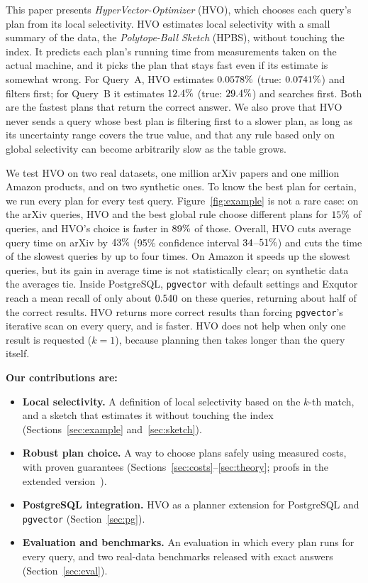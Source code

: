 \documentclass[sigconf, nonacm]{acmart}
\begin{document}
This paper presents \emph{HyperVector-Optimizer} (HVO), which chooses each query's plan from its local selectivity. HVO estimates local selectivity with a small summary of the data, the \emph{Polytope-Ball Sketch} (HPBS), without touching the index. It predicts each plan's running time from measurements taken on the actual machine, and it picks the plan that stays fast even if its estimate is somewhat wrong. For Query~A, HVO estimates $0.0578\%$ (true: $0.0741\%$) and filters first; for Query~B it estimates $12.4\%$ (true: $29.4\%$) and searches first. Both are the fastest plans that return the correct answer. We also prove that HVO never sends a query whose best plan is filtering first to a slower plan, as long as its uncertainty range covers the true value, and that any rule based only on global selectivity can become arbitrarily slow as the table grows.

We test HVO on two real datasets, one million arXiv papers and one million Amazon products, and on two synthetic ones. To know the best plan for certain, we run every plan for every test query. Figure~\ref{fig:example} is not a rare case: on the arXiv queries, HVO and the best global rule choose different plans for $15\%$ of queries, and HVO's choice is faster in $89\%$ of those. Overall, HVO cuts average query time on arXiv by $43\%$ (95\% confidence interval $34$--$51\%$) and cuts the time of the slowest queries by up to four times. On Amazon it speeds up the slowest queries, but its gain in average time is not statistically clear; on synthetic data the averages tie. Inside PostgreSQL, \texttt{pgvector} with default settings and Exqutor reach a mean recall of only about $0.540$ on these queries, returning about half of the correct results. HVO returns more correct results than forcing \texttt{pgvector}'s iterative scan on every query, and is faster. HVO does not help when only one result is requested ($k=1$), because planning then takes longer than the query itself.

\noindent\textbf{Our contributions are:}
\begin{itemize}
  \item \textbf{Local selectivity.} A definition of local selectivity based on the $k$-th match, and a sketch that estimates it without touching the index (Sections~\ref{sec:example} and~\ref{sec:sketch}).
  \item \textbf{Robust plan choice.} A way to choose plans safely using measured costs, with proven guarantees (Sections~\ref{sec:costs}--\ref{sec:theory}; proofs in the extended version~\cite{hvoextended}).
  \item \textbf{PostgreSQL integration.} HVO as a planner extension for PostgreSQL and \texttt{pgvector} (Section~\ref{sec:pg}).
  \item \textbf{Evaluation and benchmarks.} An evaluation in which every plan runs for every query, and two real-data benchmarks released with exact answers~\cite{hvobench} (Section~\ref{sec:eval}).
\end{itemize}
\end{document}
